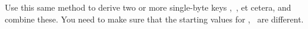Use this same method to derive two or more single-byte keys
,~, et cetera, and combine these. You need to make sure that the
starting values for ,~ are different.
